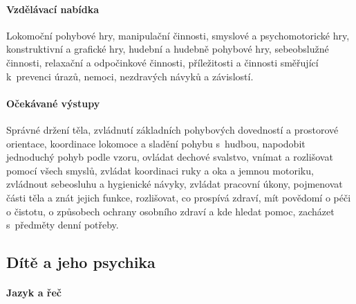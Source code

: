 				\paragraph{Vzdělávací nabídka}
					Lokomoční pohybové hry, manipulační činnosti, smyslové a psychomotorické hry, konstruktivní a grafické hry, hudební a hudebně pohybové hry, sebeobslužné činnosti, relaxační a odpočinkové činnosti, příležitosti a činnosti směřující k prevenci úrazů, nemoci, nezdravých návyků a závislostí.
				\paragraph{Očekávané výstupy}
					Správné držení těla, zvládnutí základních pohybových dovedností a prostorové orientace, koordinace lokomoce a sladění pohybu s hudbou, napodobit jednoduchý pohyb podle vzoru, ovládat dechové svalstvo, vnímat a rozlišovat pomocí všech smyslů, zvládat koordinaci ruky a oka a jemnou motoriku, zvládnout sebeosluhu a hygienické návyky, zvládat pracovní úkony, pojmenovat části těla a znát jejich funkce, rozlišovat, co prospívá zdraví, mít povědomí o péči o čistotu, o způsobech ochrany osobního zdraví a kde hledat pomoc, zacházet s předměty denní potřeby.

			\subsection{Dítě a jeho psychika}
				\textit{} \citep[s.~18]{RVP}

				\paragraph{Jazyk a řeč}

